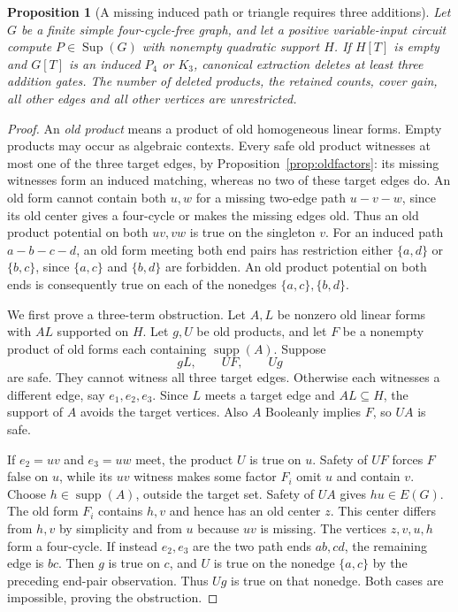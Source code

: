 \documentclass[11pt]{article}
\newcommand{\supp}{\operatorname{supp}}
\newcommand{\Sup}{\operatorname{Sup}}
\newtheorem{proposition}[theorem]{Proposition}
\theoremstyle{definition}
\theoremstyle{remark}
\begin{document}
\begin{proposition}[A missing induced path or triangle requires three additions]\label{prop:twosumspathtriangle}
Let $G$ be a finite simple four-cycle-free graph, and let a positive variable-input circuit compute $P\in\Sup(G)$ with nonempty quadratic support $H$. If $H[T]$ is empty and $G[T]$ is an induced $P_4$ or $K_3$, canonical extraction deletes at least three addition gates. The number of deleted products, the retained counts, cover gain, all other edges and all other vertices are unrestricted.
\end{proposition}
\begin{proof}
An \emph{old product} means a product of old homogeneous linear forms. Empty products may occur as algebraic contexts. Every safe old product witnesses at most one of the three target edges, by Proposition~\ref{prop:oldfactors}: its missing witnesses form an induced matching, whereas no two of these target edges do. An old form cannot contain both $u,w$ for a missing two-edge path $u-v-w$, since its old center gives a four-cycle or makes the missing edges old. Thus an old product potential on both $uv,vw$ is true on the singleton $v$. For an induced path $a-b-c-d$, an old form meeting both end pairs has restriction either $\{a,d\}$ or $\{b,c\}$, since $\{a,c\}$ and $\{b,d\}$ are forbidden. An old product potential on both ends is consequently true on each of the nonedges $\{a,c\},\{b,d\}$.

We first prove a three-term obstruction. Let $A,L$ be nonzero old linear forms with $AL$ supported on $H$. Let $g,U$ be old products, and let $F$ be a nonempty product of old forms each containing $\supp(A)$. Suppose
\[
 gL,\qquad UF,\qquad Ug
\]
are safe. They cannot witness all three target edges. Otherwise each witnesses a different edge, say $e_1,e_2,e_3$. Since $L$ meets a target edge and $AL\subseteq H$, the support of $A$ avoids the target vertices. Also $A$ Booleanly implies $F$, so $UA$ is safe.

If $e_2=uv$ and $e_3=uw$ meet, the product $U$ is true on $u$. Safety of $UF$ forces $F$ false on $u$, while its $uv$ witness makes some factor $F_i$ omit $u$ and contain $v$. Choose $h\in\supp(A)$, outside the target set. Safety of $UA$ gives $hu\in E(G)$. The old form $F_i$ contains $h,v$ and hence has an old center $z$. This center differs from $h,v$ by simplicity and from $u$ because $uv$ is missing. The vertices $z,v,u,h$ form a four-cycle. If instead $e_2,e_3$ are the two path ends $ab,cd$, the remaining edge is $bc$. Then $g$ is true on $c$, and $U$ is true on the nonedge $\{a,c\}$ by the preceding end-pair observation. Thus $Ug$ is true on that nonedge. Both cases are impossible, proving the obstruction.


\end{proof}
\end{document}
